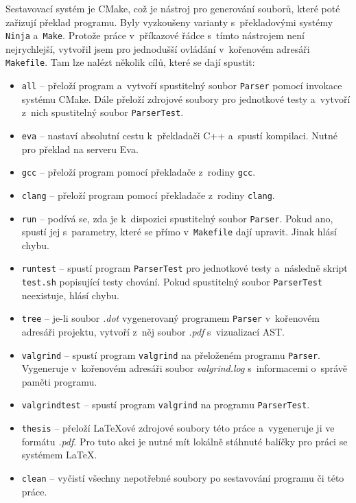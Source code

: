 Sestavovací systém je CMake, což je nástroj pro generování souborů, které poté zařizují překlad programu.
Byly vyzkoušeny varianty s~překladovými systémy \texttt{Ninja} a~\texttt{Make}.
Protože práce v~příkazové řádce s~tímto nástrojem není nejrychlejší, vytvořil jsem pro jednodušší ovládání v~kořenovém adresáři \texttt{Makefile}.
Tam lze nalézt několik cílů, které se dají spustit:
\begin{itemize}
    \item \texttt{all} -- přeloží program a~vytvoří spustitelný soubor \texttt{Parser} pomocí invokace systému CMake.
    Dále přeloží zdrojové soubory pro jednotkové testy a~vytvoří z~nich spustitelný soubor \texttt{ParserTest}.
    \item \texttt{eva} -- nastaví absolutní cestu k~překladači C++ a~spustí kompilaci. Nutné pro překlad na serveru Eva.
    \item \texttt{gcc} -- přeloží program pomocí překladače z~rodiny \texttt{gcc}.
    \item \texttt{clang} -- přeloží program pomocí překladače z~rodiny \texttt{clang}.
    \item \texttt{run} -- podívá se, zda je k~dispozici spustitelný soubor \texttt{Parser}. Pokud ano, spustí jej s~parametry, které se přímo v~\texttt{Makefile} dají upravit.
    Jinak hlásí chybu.
    \item \texttt{runtest} -- spustí program \texttt{ParserTest} pro jednotkové testy a~následně skript \texttt{test.sh} popisující testy chování.
    Pokud spustitelný soubor \texttt{ParserTest} neexistuje, hlásí chybu.
    \item \texttt{tree} -- je-li soubor \emph{.dot} vygenerovaný programem \texttt{Parser} v~kořenovém adresáři projektu, vytvoří z~něj soubor \emph{.pdf} s~vizualizací AST.
    \item \texttt{valgrind} -- spustí program \texttt{valgrind} na přeloženém programu \texttt{Parser}. Vygeneruje v~kořenovém adresáři soubor \emph{valgrind.log} s~informacemi o~správě paměti programu.
    \item \texttt{valgrind\textunderscore test} -- spustí program \texttt{valgrind} na programu \texttt{ParserTest}.
    \item \texttt{thesis} -- přeloží \LaTeX ové zdrojové soubory této práce a~vygeneruje ji ve formátu \emph{.pdf}. 
    Pro tuto akci je nutné mít lokálně stáhnuté balíčky pro práci se systémem \LaTeX.
    \item \texttt{clean} -- vyčistí všechny nepotřebné soubory po sestavování programu či této práce.
\end{itemize}

